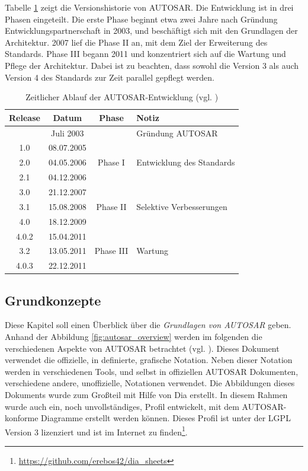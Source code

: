 \documentclass[
  a4paper,					    %
  twoside,
  DIV=calc,     				%
  bibliography=totoc,
  cleardoublepage=empty,
  ngerman,     					%
  final       					%
]{scrbook}
\begin{document}
Tabelle \ref{tab:timeline} zeigt die Versionshistorie von AUTOSAR. Die Entwicklung ist in drei Phasen eingeteilt. Die erste Phase beginnt etwa zwei Jahre nach Gründung Entwicklungspartnerschaft in 2003, und beschäftigt sich mit den Grundlagen der Architektur. 2007 lief die Phase II an, mit dem Ziel der Erweiterung des Standards. Phase III begann 2011 und konzentriert sich auf die Wartung und Pflege der Architektur. Dabei ist zu beachten, dass sowohl die Version 3 als auch Version 4 des Standards zur Zeit parallel gepflegt werden.

\begin{table}[h]
    \centering
    \begin{tabular}[h]{c c c l}
    \toprule
    Release & Datum & Phase & Notiz\\
    \midrule
          & Juli 2003  &  & Gründung AUTOSAR\\
    \midrule
    1.0   & 08.07.2005 & \multirow{3}{*}{Phase I} & \\
    2.0	  & 04.05.2006 &  & Entwicklung des Standards\\
    2.1	  & 04.12.2006 &  & \\
    \midrule
    3.0	  & 21.12.2007 & \multirow{3}{*}{Phase II} & \\
    3.1	  & 15.08.2008 &  & Selektive Verbesserungen\\
    4.0	  & 18.12.2009 &  & \\
    \midrule
    4.0.2 & 15.04.2011 & \multirow{3}{*}{Phase III} & \\
    3.2	  & 13.05.2011 &  & Wartung\\
    4.0.3 & 22.12.2011 &  & \\
    \bottomrule
    \end{tabular}
    \caption{Zeitlicher Ablauf der AUTOSAR-Entwicklung (vgl. \cite{as_background}\cite{as_roadmap}\cite{wiki:autosar_de})}
    \label{tab:timeline}
\end{table}








\subsection{Grundkonzepte}
\label{sec:Grundkonzepte}
Diese Kapitel soll einen Überblick über die \emph{Grundlagen von AUTOSAR} geben. Anhand der Abbildung \ref{fig:autosar_overview} werden im folgenden die verschiedenen Aspekte von AUTOSAR betrachtet (vgl. \cite{autosar_techoverview}). Dieses Dokument verwendet die offizielle, in \cite{autosar_graph} definierte, grafische Notation. Neben dieser Notation werden in verschiedenen Tools, und selbst in offiziellen AUTOSAR Dokumenten, verschiedene andere, unoffizielle, Notationen verwendet. Die Abbildungen dieses Dokuments wurde zum Großteil mit Hilfe von Dia erstellt. In diesem Rahmen wurde auch ein, noch unvollständiges, Profil entwickelt, mit dem AUTOSAR-konforme Diagramme erstellt werden können. Dieses Profil ist unter der LGPL Version 3 lizenziert und ist im Internet zu finden\footnote{\url{https://github.com/erebos42/dia_sheets}}.
\end{document}
